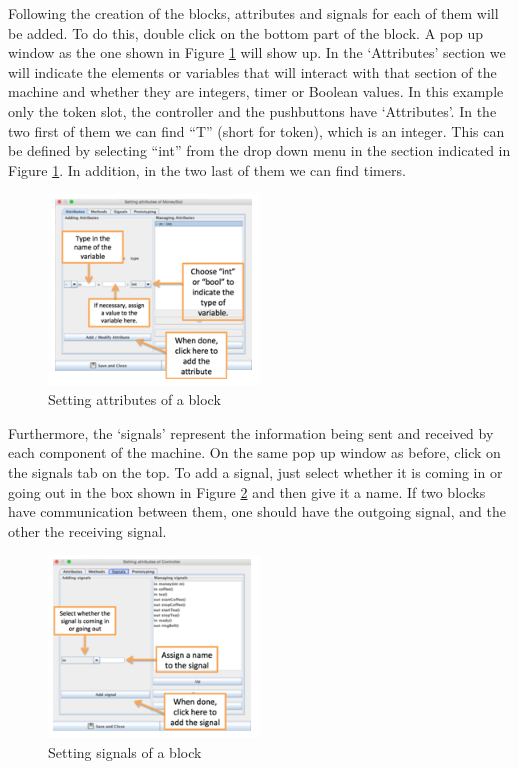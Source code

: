 \documentclass[12pt]{article}
\begin{document}
	Following the creation of the blocks, attributes and signals for each of them will be added. To do this, double click on the bottom part of the block. A pop up window as the one shown in Figure \ref{fig:setattribute} will show up. In the ‘Attributes’ section we will indicate the elements or variables that will interact with that section of the machine and whether they are integers, timer or Boolean values. In this example only the token slot, the controller and the pushbuttons have ‘Attributes’. In the two first of them we can find “T” (short for token), which is an integer. This can be defined by selecting “int” from the drop down menu in the section indicated in Figure \ref{fig:setattribute}. In addition, in the two last of them we can find timers.


\begin{figure}[htbp]
\centering
\includegraphics[width=0.5\textwidth]{fig/setattribute.png}
\caption{Setting attributes of a block} \label{fig:setattribute}
\end{figure}


Furthermore, the ‘signals’ represent the information being sent and received by each component of the machine. On the same pop up window as before, click on the signals tab on the top. To add a signal, just select whether it is coming in or going out in the box shown in Figure \ref{fig:setsignal} and then give it a name. If two blocks have communication between them, one should have the outgoing signal, and the other the receiving signal. 

\begin{figure}[htbp]
\centering
\includegraphics[width=0.5\textwidth]{fig/setsignal.png}
\caption{Setting signals of a block} \label{fig:setsignal}
\end{figure}
\end{document}
